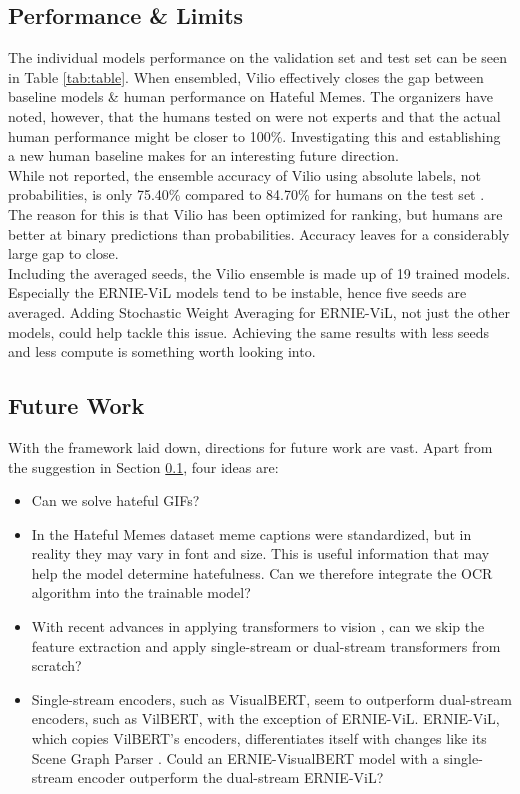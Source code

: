 \documentclass{article}
\begin{document}
\subsection{Performance \& Limits}
\label{sec:performance}

The individual models performance on the validation set and test set can be seen in Table \ref{tab:table}. When ensembled, Vilio effectively closes the gap between baseline models \& human performance on Hateful Memes. The organizers have noted, however, that the humans tested on were not experts and that the actual human performance might be closer to 100\%. Investigating this and establishing a new human baseline makes for an interesting future direction. \\
While not reported, the ensemble accuracy of Vilio using absolute labels, not probabilities, is only 75.40\% compared to 84.70\% for humans on the test set \cite{kiela2020hateful}. The reason for this is that Vilio has been optimized for ranking, but humans are better at binary predictions than probabilities. Accuracy leaves for a considerably large gap to close. \\
Including the averaged seeds, the Vilio ensemble is made up of 19 trained models. Especially the ERNIE-ViL models tend to be instable, hence five seeds are averaged. Adding Stochastic Weight Averaging \cite{izmailov2018averaging} for ERNIE-ViL, not just the other models, could help tackle this issue. Achieving the same results with less seeds and less compute is something worth looking into.








\subsection{Future Work}

With the framework laid down, directions for future work are vast. Apart from the suggestion in Section \ref{sec:performance}, four ideas are:

\begin{itemize}
    \item Can we solve hateful GIFs? 
    \item In the Hateful Memes dataset meme captions were standardized, but in reality they may vary in font and size. This is useful information that may help the model determine hatefulness. Can we therefore integrate the OCR algorithm into the trainable model? 
    \item With recent advances in applying transformers to vision \cite{dosovitskiy2020image}, can we skip the feature extraction and apply single-stream or dual-stream transformers from scratch?
    \item Single-stream encoders, such as VisualBERT, seem to outperform dual-stream encoders, such as VilBERT, with the exception of ERNIE-ViL. ERNIE-ViL, which copies VilBERT's encoders, differentiates itself with changes like its Scene Graph Parser {\cite{yu2020ernie}}. Could an ERNIE-VisualBERT model with a single-stream encoder outperform the dual-stream ERNIE-ViL? 
\end{itemize}
\end{document}
